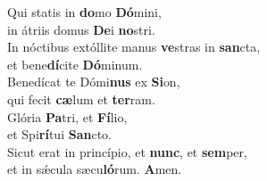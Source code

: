 \evenverse Qui statis in \textbf{do}mo \textbf{Dó}mini,~\*\\
\evenverse in átriis domus \textbf{De}i \textbf{no}stri.\\
\oddverse In nóctibus extóllite manus \textbf{ve}stras in \textbf{san}cta,~\*\\
\oddverse et bene\textbf{dí}cite \textbf{Dó}minum.\\
\evenverse Benedícat te Dómi\textbf{nus} ex \textbf{Si}on,~\*\\
\evenverse qui fecit \textbf{cæ}lum et \textbf{ter}ram.\\
\oddverse Glória \textbf{Pa}tri, et \textbf{Fí}lio,~\*\\
\oddverse et Spi\textbf{rí}tui \textbf{San}cto.\\
\evenverse Sicut erat in princípio, et \textbf{nunc}, et \textbf{sem}per,~\*\\
\evenverse et in sǽcula sæcu\textbf{ló}rum. \textbf{A}men.\\
